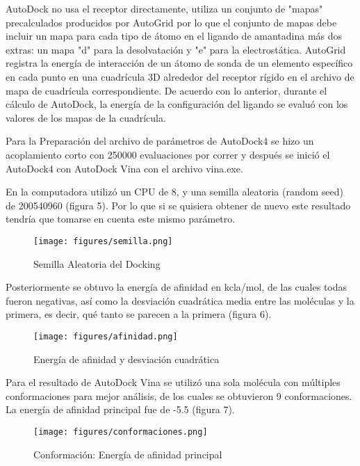 \documentclass[12pt]{article}
\begin{document}
	
AutoDock no usa el receptor directamente, utiliza un conjunto de "mapas" precalculados producidos por AutoGrid por lo que el conjunto de mapas debe incluir un mapa para cada tipo de átomo en el ligando de amantadina más dos extras: un mapa "d" para la desolvatación y "e" para la electrostática. 
AutoGrid registra la energía de interacción de un átomo de sonda de un elemento específico en cada punto en una cuadrícula 3D alrededor del receptor rígido en el archivo de mapa de cuadrícula correspondiente. De acuerdo con lo anterior, durante el cálculo de AutoDock, la energía de la configuración del ligando se evaluó con los valores de los mapas de la cuadrícula.

Para la Preparación del archivo de parámetros de AutoDock4 se hizo un acoplamiento corto con 250000 evaluaciones por correr y después se inició el AutoDock4 con AutoDock Vina con el archivo vina.exe. 

En la computadora utilizó un CPU de 8, y una semilla aleatoria (random seed) de 200540960 (figura 5). Por lo que si se quisiera obtener de nuevo este resultado tendría que tomarse en cuenta este mismo parámetro. 


	\begin{figure}[!ht]
 \centering
 \texttt{[image: figures/semilla.png]}
 \caption{Semilla Aleatoria del Docking}
 \label{fig:exemplo}
\end{figure}


Posteriormente se obtuvo la energía de afinidad en kcla/mol, de las cuales todas fueron negativas, así como la desviación cuadrática media entre las moléculas y la primera, es decir, qué tanto se parecen a la primera (figura 6). 



	\begin{figure}[!ht]
 \centering
 \texttt{[image: figures/afinidad.png]}
 \caption{Energía de afinidad y desviación cuadrática}
 \label{fig:exemplo}
\end{figure}


Para el resultado de AutoDock Vina se utilizó una sola molécula con múltiples conformaciones para mejor análisis, de los cuales se obtuvieron 9 conformaciones. La energía de afinidad principal fue de -5.5 (figura 7).  


	\begin{figure}[!ht]
 \centering
 \texttt{[image: figures/conformaciones.png]}
 \caption{Conformación: Energía de afinidad principal}
 \label{fig:exemplo}
\end{figure}
\end{document}
